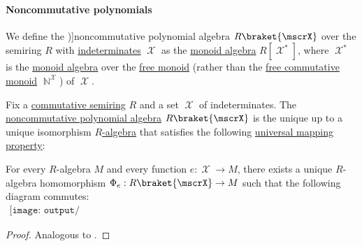\paragraph{Noncommutative polynomials}

\begin{definition}\label{def:noncommutative_polynomial_algebra}
  We define the \term[ru=алгебра некоммутативных многочленов (\cite[92]{Шафаревич1999ОсновныеПонятияАлгебры})]{noncommutative polynomial algebra} \( R\braket{ \mscrX } \) over the semiring \( R \) with \hyperref[con:indeterminate]{indeterminates} \( \mscrX \) as the \hyperref[def:semigroup_algebra]{monoid algebra} \( R[\mscrX^*] \), where \( \mscrX^* \) is the
  \hyperref[def:semigroup_algebra]{monoid algebra} over the \hyperref[def:free_monoid]{free monoid} (rather than the \hyperref[def:free_commutative_monoid]{free commutative monoid} \( \BbbN^\mscrX \)) of \( \mscrX \).
\end{definition}

\begin{theorem}\label{thm:noncommutative_polynomial_algebra_universal_property}
  Fix a \hyperref[def:semiring/commutative]{commutative semiring} \( R \) and a set \( \mscrX \) of indeterminates. The \hyperref[def:noncommutative_polynomial_algebra]{noncommutative polynomial algebra} \( R\braket{\mscrX} \) is the unique up to a unique isomorphism \hyperref[def:algebra_over_semiring]{\( R \)-algebra} that satisfies the following \hyperref[rem:universal_mapping_property]{universal mapping property}:
  \begin{displayquote}
    For every \( R \)-algebra \( M \) and every function \( e: \mscrX \to M \), there exists a unique \( R \)-algebra homomorphism \( \Phi_e: R\braket{\mscrX} \to M \) such that the following diagram commutes:
    \begin{equation}\label{eq:thm:noncommutative_polynomial_algebra_universal_property/diagram}
      \begin{aligned}
        \texttt{[image: output/thm\_\_noncommutative\_polynomial\_algebra\_universal\_property]}
      \end{aligned}
    \end{equation}
  \end{displayquote}
\end{theorem}
\begin{proof}
  Analogous to .
\end{proof}
